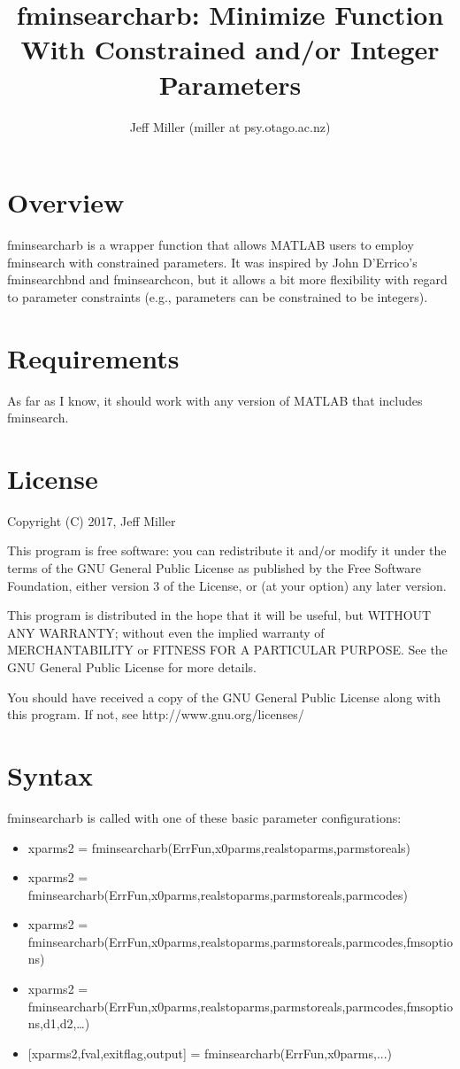 \documentclass{article}
\title{fminsearcharb: Minimize Function With Constrained and/or Integer Parameters}
\author{Jeff Miller (miller at psy.otago.ac.nz)}
\begin{document}
\maketitle
\tableofcontents

\section{Overview}

fminsearcharb is a wrapper function that allows MATLAB users to employ fminsearch with constrained parameters.
It was inspired by John D'Errico's fminsearchbnd and fminsearchcon, but it allows a bit
more flexibility with regard to parameter constraints (e.g., parameters can be
constrained to be integers).

\section{Requirements}

As far as I know, it should work with any version of MATLAB that includes fminsearch.

\section{License}

Copyright (C) 2017, Jeff Miller

This program is free software: you can redistribute it and/or modify
it under the terms of the GNU General Public License as published by
the Free Software Foundation, either version 3 of the License, or
(at your option) any later version.

This program is distributed in the hope that it will be useful,
but WITHOUT ANY WARRANTY; without even the implied warranty of
MERCHANTABILITY or FITNESS FOR A PARTICULAR PURPOSE.  See the
GNU General Public License for more details.

You should have received a copy of the GNU General Public License
along with this program.  If not, see http://www.gnu.org/licenses/ 

\section{Syntax}

fminsearcharb is called with one of these basic parameter configurations:
\begin{itemize}
\item xparms2 = fminsearcharb(ErrFun,x0parms,realstoparms,parmstoreals)
\item xparms2 = fminsearcharb(ErrFun,x0parms,realstoparms,parmstoreals,parmcodes)
\item xparms2 = fminsearcharb(ErrFun,x0parms,realstoparms,parmstoreals,parmcodes,fmsoptions)
\item xparms2 = fminsearcharb(ErrFun,x0parms,realstoparms,parmstoreals,parmcodes,fmsoptions,d1,d2,\ldots)
\item {[xparms2,fval,exitflag,output]} = fminsearcharb(ErrFun,x0parms,...)
\end{itemize}
\end{document}
